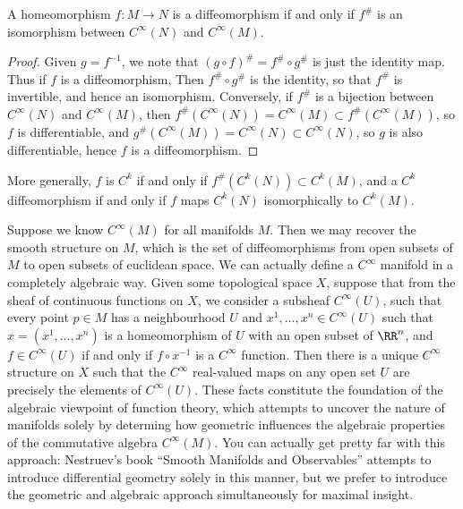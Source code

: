 \begin{theorem}
    A homeomorphism $f:M \to N$ is a diffeomorphism if and only if $f^\#$ is an isomorphism between $C^\infty(N)$ and $C^\infty(M)$.
\end{theorem}
\begin{proof}
    Given $g = f^{-1}$, we note that $(g \circ f)^\# = f^\# \circ g^\#$ is just the identity map. Thus if $f$ is a diffeomorphism, Then $f^\# \circ g^\#$ is the identity, so that $f^\#$ is invertible, and hence an isomorphism. Conversely, if $f^\#$ is a bijection between $C^\infty(N)$ and $C^\infty(M)$, then $f^\#(C^\infty(N)) = C^\infty(M) \subset f^\#(C^\infty(M))$, so $f$ is differentiable, and $g^\#(C^\infty(M)) = C^\infty(N) \subset C^\infty(N)$, so $g$ is also differentiable, hence $f$ is a diffeomorphism.
\end{proof}

\begin{remark}
    More generally, $f$ is $C^k$ if and only if $f^\#(C^k(N)) \subset C^k(M)$, and a $C^k$ diffeomorphism if and only if $f$ maps $C^k(N)$ isomorphically to $C^k(M)$.
\end{remark}

Suppose we know $C^\infty(M)$ for all manifolds $M$. Then we may recover the smooth structure on $M$, which is the set of diffeomorphisms from open subsets of $M$ to open subsets of euclidean space. We can actually define a $C^\infty$ manifold in a completely algebraic way. Given some topological space $X$, suppose that from the sheaf of continuous functions on $X$, we consider a subsheaf $C^\infty(U)$, such that every point $p \in M$ has a neighbourhood $U$ and $x^1, \dots, x^n \in C^\infty(U)$ such that $x = (x^1, \dots, x^n)$ is a homeomorphism of $U$ with an open subset of $\RR^n$, and $f \in C^\infty(U)$ if and only if $f \circ x^{-1}$ is a $C^\infty$ function. Then there is a unique $C^\infty$ structure on $X$ such that the $C^\infty$ real-valued maps on any open set $U$ are precisely the elements of $C^\infty(U)$. These facts constitute the foundation of the algebraic viewpoint of function theory, which attempts to uncover the nature of manifolds solely by determing how geometric influences the algebraic properties of the commutative algebra $C^\infty(M)$. You can actually get pretty far with this approach: Nestruev's book ``Smooth Manifolds and Observables'' attempts to introduce differential geometry solely in this manner, but we prefer to introduce the geometric and algebraic approach simultaneously for maximal insight.

